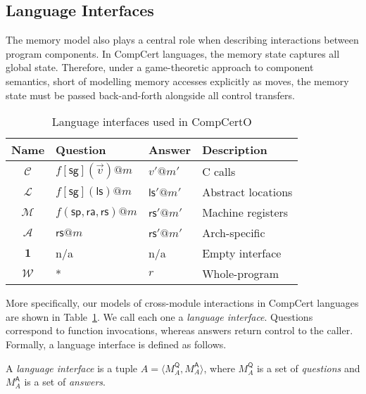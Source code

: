 \documentclass[sigplan,10pt,review,anonymous]{acmart}
\newcommand{\kw}[1]{\ensuremath{ \mathsf{#1} }}
\begin{document}
\subsection{Language Interfaces} \label{sec:sem:li} %

The memory model also plays a central role
when describing interactions between program components.
In CompCert languages,
the memory state captures all global state.
Therefore,
under a game-theoretic approach to component semantics,
short of modelling memory accesses explicitly as moves,
the memory state must be passed back-and-forth
alongside all control transfers.

\begin{table}[t] %
  \begin{tabular}{clll}
    \hline
    Name & Question & Answer & Description \\
    \hline
    $\mathcal{C}$ & $f[\kw{sg}](\vec{v})@m$ & $v'@m'$ &
      C calls \\
    $\mathcal{L}$ & $f[\kw{sg}](\kw{ls})@m$ & $\kw{ls}'@m'$ &
      Abstract locations \\
    $\mathcal{M}$ & $f(\kw{sp},\kw{ra},\kw{rs})@m$ & $\kw{rs}'@m'$ &
      Machine registers \\
    $\mathcal{A}$ & $\kw{rs}@m$ & $\kw{rs}'@m'$ &
      Arch-specific \\
    $\mathbf{1}$ & n/a & n/a &
      Empty interface \\
    $\mathcal{W}$ & * & $r$ &
      Whole-program \\
    \hline
  \end{tabular}
  \caption{Language interfaces used in CompCertO}
  \label{tbl:li}
\end{table}

More specifically,
our models of cross-module interactions in CompCert languages
are shown in Table~\ref{tbl:li}.
We call each one a \emph{language interface}.
Questions correspond to function invocations,
whereas answers return control to the caller.
Formally,
a language interface is defined as follows.

\begin{definition}
A \emph{language interface} is a tuple
$A = \langle M_A^\kw{Q}, M_A^\kw{A} \rangle$, where
$M_A^\kw{Q}$ is a set of \emph{questions} and
$M_A^\kw{A}$ is a set of \emph{answers}.
\end{definition}
\end{document}
